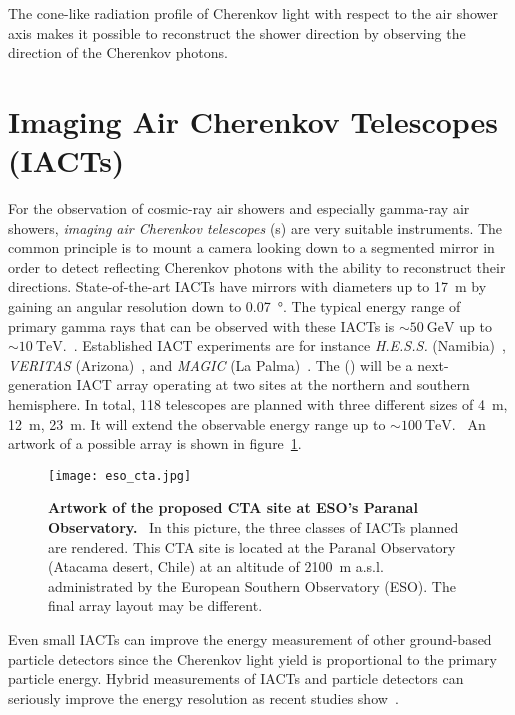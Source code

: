 The cone-like radiation profile of Cherenkov light with respect to the air shower axis makes it possible to reconstruct the shower direction by observing the direction of the Cherenkov photons.

\section{Imaging Air Cherenkov Telescopes (IACTs)}

For the observation of cosmic-ray air showers and especially gamma-ray air showers, \textit{imaging air Cherenkov telescopes} (s) are very suitable instruments. The common principle is to mount a camera looking down to a segmented mirror in order to detect reflecting Cherenkov photons with the ability to reconstruct their directions. State-of-the-art IACTs have mirrors with diameters up to \SI{17}{\meter} by gaining an angular resolution down to \SI{0.07}{\degree}. The typical energy range of primary gamma rays that can be observed with these IACTs is $\sim\SI{50}{\giga\electronvolt}$ up to $\sim\SI{10}{\tera\electronvolt}$.~\cite{iacts:magic}. Established IACT experiments are for instance \textit{H.E.S.S.} (Namibia)~\cite{iacts:hess}, \textit{VERITAS} (Arizona)~\cite{iacts:veritas}, and \textit{MAGIC} (La Palma)~\cite{iacts:magic}. The  () will be a next-generation IACT array operating at two sites at the northern and southern hemisphere. In total, \num{118} telescopes are planned with three different sizes of \SI{4}{\meter}, \SI{12}{\meter}, \SI{23}{\meter}. It will extend the observable energy range up to $\sim\SI{100}{\tera\electronvolt}$.~\cite{iacts:cta} An artwork of a possible array is shown in figure~\ref{cta_artwork}.

\begin{figure}[H]
	\centering
	\texttt{[image: eso\_cta.jpg]}
	\caption[Artwork of the proposed CTA site at ESO's Paranal Observatory]{\textbf{Artwork of the proposed CTA site at ESO's Paranal Observatory.}~\cite{iacts:cta_artwork} In this picture, the three classes of IACTs planned are rendered. This CTA site is located at the Paranal Observatory (Atacama desert, Chile) at an altitude of \SI{2100}{\meter} a.s.l. administrated by the European Southern Observatory (ESO). The final array layout may be different.~\cite{iacts:cta}}
	\label{cta_artwork}
\end{figure}

Even small IACTs can improve the energy measurement of other ground-based particle detectors since the Cherenkov light yield is proportional to the primary particle energy. Hybrid measurements of IACTs and particle detectors can seriously improve the energy resolution as recent studies show~\cite{iacts:extension}.

